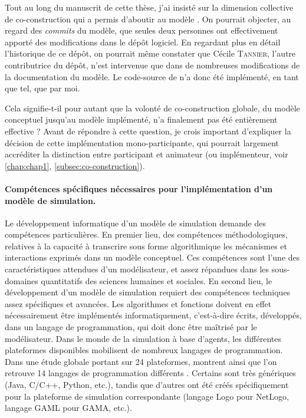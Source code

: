 Tout au long du manuscrit de cette thèse, j'ai insisté sur la dimension collective de co-construction qui a permis d'aboutir au modèle \simfeodal{}.
On pourrait objecter, au regard des \textit{commits} du modèle, que seules deux personnes ont effectivement apporté des modifications dans le dépôt logiciel.
En regardant plus en détail l'historique de ce dépôt, on pourrait même constater que Cécile \textsc{Tannier}, l'autre contributrice du dépôt, n'est intervenue \og que\fg{} dans de nombreuses modifications de la documentation du modèle.
Le code-source de \simfeodal{} n'a donc été implémenté, en tant que tel, que par moi.

Cela signifie-t-il pour autant que la volonté de co-construction globale, du modèle conceptuel jusqu'au modèle implémenté, n'a finalement pas été entièrement effective ?
Avant de répondre à cette question, je crois important d'expliquer la décision de cette implémentation mono-participante, qui pourrait largement accréditer la distinction entre \og participant\fg{} et \og animateur\fg{} (ou \og implémenteur\fg{}, voir \cref{chap:chap1}, \cref{subsec:co-construction}).

\paragraph{Compétences spécifiques nécessaires pour l'implémentation d'un modèle de simulation.}
Le développement informatique d'un modèle de simulation demande des compétences particulières.
En premier lieu, des compétences méthodologiques, relatives à la capacité à transcrire sous forme algorithmique les mécanismes et interactions exprimés dans un modèle conceptuel.
Ces compétences sont l'une des caractéristiques attendues d'un \og modélisateur\fg{}, et assez répandues dans les sous-domaines quantitatifs des sciences humaines et sociales.
En second lieu, le développement d'un modèle de simulation requiert des compétences techniques assez spécifiques et avancées.
Les algorithmes et fonctions doivent en effet nécessairement être \og implémentés\fg{} informatiquement, c'est-à-dire écrits, \og développés\fg{}, dans un langage de programmation, qui doit donc être maîtrisé par le modélisateur.
Dans le monde de la simulation à base d'agents, les différentes plateformes disponibles mobilisent de nombreux langages de programmation.
Dans une étude globale portant sur 24 plateformes, \textcite{kravari_survey_2015} montrent ainsi que l'on retrouve 14 langages de programmation différents \autocite[table 7, \S 4.3]{kravari_survey_2015}.
Certains sont très génériques (Java, C/C++, Python, etc.), tandis que d'autres ont été créés spécifiquement pour la plateforme de simulation correspondante (langage Logo pour NetLogo, langage GAML pour GAMA, etc.).

